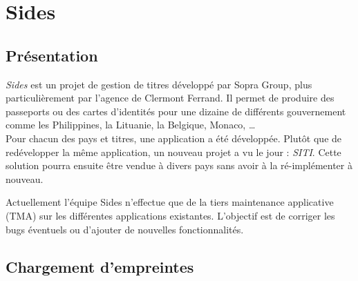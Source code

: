 \cleardoublepage

\chapter{Sides}


\section{Présentation}

\textit{Sides} est un projet de gestion de titres développé par Sopra Group, plus particulièrement par l'agence de Clermont Ferrand.
Il permet de produire des passeports ou des cartes d'identités pour une dizaine de différents gouvernement comme les Philippines, la Lituanie, la Belgique, Monaco, \ldots
\\

Pour chacun des pays et titres, une application a été développée.
Plutôt que de redévelopper la même application, un nouveau projet a vu le jour : \textit{SITI}.
Cette solution pourra ensuite être vendue à divers pays sans avoir à la ré-implémenter à nouveau.

Actuellement l'équipe Sides n'effectue que de la tiers maintenance applicative (TMA) sur les différentes applications existantes.
L'objectif est de corriger les bugs éventuels ou d'ajouter de nouvelles fonctionnalités.


\section{Chargement d'empreintes}


